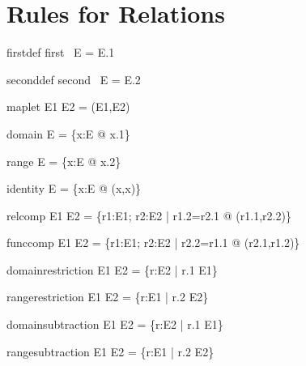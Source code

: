 \documentclass{article}
\begin{document}
\section{Rules for Relations}

\begin{zedrule}{firstdef}
   first~ E = E.1
\end{zedrule}

\begin{zedrule}{seconddef}
   second~ E = E.2
\end{zedrule}

\begin{zedrule}{maplet}
   E1 \mapsto E2 = (E1,E2)
\end{zedrule}

\begin{zedrule}{domain}
   \dom E = \{x:E @ x.1\}
\end{zedrule}

\begin{zedrule}{range}
   \ran E = \{x:E @ x.2\}
\end{zedrule}

\begin{zedrule}{identity}
   \id E = \{x:E @ (x,x)\}
\end{zedrule}

\begin{zedrule}{relcomp}
   E1 \comp E2 = \{r1:E1; r2:E2 | r1.2=r2.1 @ (r1.1,r2.2)\}
\end{zedrule}

\begin{zedrule}{funccomp}
   E1 \circ E2 = \{r1:E1; r2:E2 | r2.2=r1.1 @ (r2.1,r1.2)\}
\end{zedrule}

\begin{zedrule}{domainrestriction}
   E1 \dres E2 = \{r:E2 | r.1 \in E1\}
\end{zedrule}

\begin{zedrule}{rangerestriction}
   E1 \rres E2 = \{r:E1 | r.2 \in E2\}
\end{zedrule}

\begin{zedrule}{domainsubtraction}
   E1 \ndres E2 = \{r:E2 | r.1 \notin E1\}
\end{zedrule}

\begin{zedrule}{rangesubtraction}
   E1 \nrres E2 = \{r:E1 | r.2 \notin E2\}
\end{zedrule}
\end{document}
